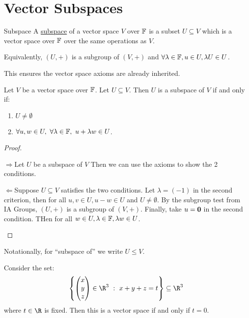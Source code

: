 \documentclass[../Main.tex]{subfiles}
\begin{document}
\section{Vector Subspaces}
\begin{definition}{Subspace}
    A \underline{subspace} of a vector space $V$ over $\mathbb{F}$ is a subset $U \subseteq V$ which is a vector space over $\mathbb{F}$ over the same operations as $V$.

    Equivalently, $(U, +)$ is a subgroup of $(V, +)$ and $\forall \lambda \in \mathbb{F}, u \in U, \lambda U \in U$.
\end{definition}
\begin{remark}
    This ensures the vector space axioms are already inherited.
\end{remark}
\begin{proposition}
    Let $V$ be a vector space over $\mathbb{F}$. Let $U \subseteq V$. Then $U$ is a subspace of $V$ if and only if:
    \begin{enumerate}
        \item $U \neq \emptyset$
        \item $\forall u, w \in U,~\forall \lambda \in \mathbb{F},~ u + \lambda w \in U$.
    \end{enumerate}
    \label{propSubspaceTest}
\end{proposition}
\begin{proof}
    \begin{proofdirection}{$\Rightarrow$}{Let $U$ be a subspace of $V$}
        Then we can use the axioms to show the 2 conditions.
    \end{proofdirection}
    \begin{proofdirection}{$\Leftarrow$}{Suppose $U \subseteq V$ satisfies the two conditions.}
        Let $\lambda = (-1)$ in the second criterion, then for all $u, v \in U, u - w \in U$ and $U \neq \emptyset$. By the subgroup test from IA Groups, $(U, +)$ is a subgroup of $(V, +)$. Finally, take $u = \boldsymbol{0}$ in the second condition. THen for all $w \in U, \lambda \in \mathbb{F}, \lambda w \in U$.
    \end{proofdirection}
\end{proof}
Notationally, for ``subspace of'' we write $U \leq V$.
\begin{example}
    Consider the set:
    \begin{equation*}
        \left\{\begin{pmatrix} x \\ y \\ z\end{pmatrix} \in \R^3~:~x + y + z = t\right\} \subseteq \R^3
    \end{equation*}
    where $t \in \R$ is fixed. Then this is a vector space if and only if $t = 0$.
\end{example}
\end{document}
